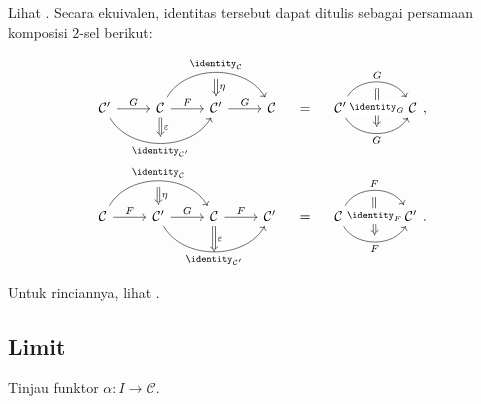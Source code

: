 Lihat \cite[(2.6) + Proposisi~2.6.5]{Li1}. Secara ekuivalen, identitas tersebut
dapat ditulis sebagai persamaan komposisi $2$-sel berikut:

\begin{equation*}\begin{gathered}
	\begin{tikzcd}
		\mathcal{C}' \arrow[r, "G"] \arrow[rr, bend right=60, "\identity_{\mathcal{C}'}"', "" {name=B}] & \mathcal{C} \arrow[r, "F"] \arrow[Rightarrow, to=B, "\varepsilon"] \arrow[rr, bend left=60, "\identity_{\mathcal{C}}", ""' {name=T}] & \mathcal{C}' \arrow[r, "G"] \arrow[Rightarrow, from=T, "\eta"] & \mathcal{C}
	\end{tikzcd} \quad = \quad \begin{tikzcd}[column sep=large]
		\mathcal{C}' \arrow[r, bend left=60, "G", ""' {name=T}] \arrow[r, bend right=60, "G"', "" {name=B}] & \mathcal{C} \arrow[Rightarrow, from=T, to=B, "{\identity_G}" description]
	\end{tikzcd} , \\
	\begin{tikzcd}
		\mathcal{C} \arrow[r, "F"] \arrow[rr, bend left=60, "\identity_{\mathcal{C}}", ""' {name=T}] & \mathcal{C}' \arrow[r, "G"] \arrow[Rightarrow, from=T, "\eta"] \arrow[rr, bend right=60, "\identity_{\mathcal{C}'}"', ""' {name=B}] & \mathcal{C} \arrow[r, "F"] \arrow[Rightarrow, to=B, "\varepsilon"] & \mathcal{C}'
	\end{tikzcd} \quad = \quad \begin{tikzcd}[column sep=large]
		\mathcal{C} \arrow[r, bend left=60, "F", ""' {name=T}] \arrow[r, bend right=60, "F"', "" {name=B}] & \mathcal{C}' \arrow[Rightarrow, from=T, to=B, "{\identity_F}" description]
	\end{tikzcd}.
\end{gathered}\end{equation*}

Untuk rinciannya, lihat \cite[Catatan~2.6.6]{Li1}.

\subsection*{Limit}

Tinjau funktor $\alpha: I \to \mathcal{C}$.

